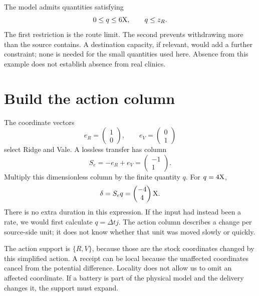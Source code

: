 The model admits quantities satisfying
\begin{equation}
0\le q\le 6\mathrm{X},\qquad q\le z_R.
\end{equation}
The first restriction is the route limit. The second prevents withdrawing more than the source contains. A destination capacity, if relevant, would add a further constraint; none is needed for the small quantities used here. Absence from this example does not establish absence from real clinics.

\section{Build the action column}

The coordinate vectors
\begin{equation}
e_R=\begin{pmatrix}1\\0\end{pmatrix},
\qquad e_V=\begin{pmatrix}0\\1\end{pmatrix}
\end{equation}
select Ridge and Vale. A lossless transfer has column
\begin{equation}
S_e=-e_R+e_V=\begin{pmatrix}-1\\1\end{pmatrix}.
\end{equation}
Multiply this dimensionless column by the finite quantity \(q\). For \(q=4\mathrm{X}\),
\begin{equation}
\delta=S_eq=\begin{pmatrix}-4\\4\end{pmatrix}\mathrm{X}.
\end{equation}
There is no extra duration in this expression. If the input had instead been a rate, we would first calculate \(q=\Delta t j\). The action column describes a change per source-side unit; it does not know whether that unit was moved slowly or quickly.

The action support is \(\{R,V\}\), because those are the stock coordinates changed by this simplified action. A receipt can be local because the unaffected coordinates cancel from the potential difference. Locality does not allow us to omit an affected coordinate. If a battery is part of the physical model and the delivery changes it, the support must expand.

